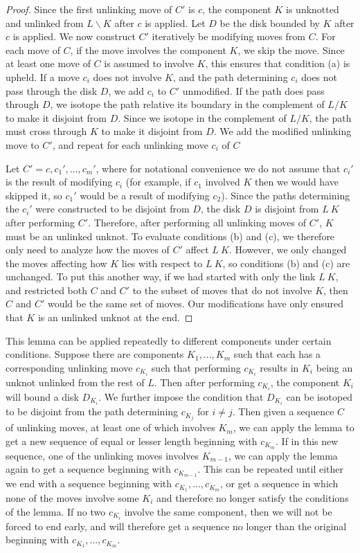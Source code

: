 \documentclass[12pt]{amsart}
\theoremstyle{definition}
\theoremstyle{remark}
\begin{document}
\begin{proof}
Since the first unlinking move of $C'$ is $c$, the component $K$ is unknotted and unlinked from $L\backslash K$ after $c$ is applied.
Let $D$ be the disk bounded by $K$ after $c$ is applied.
We now construct $C'$ iteratively be modifying moves from $C$.
For each move of $C$, if the move involves the component $K$, we skip the move.
Since at least one move of $C$ is assumed to involve $K$, this ensures that condition (a) is upheld.
If a move $c_i$ does not involve $K$, and the path determining $c_i$ does not pass through the disk $D$, we add $c_i$ to $C'$ unmodified.
If the path does pass through $D$, we isotope the path relative its boundary in the complement of $L/K$ to make it disjoint from $D$.
Since we isotope in the complement of $L/K$, the path must cross through $K$ to make it disjoint from $D$.
We add the modified unlinking move to $C'$, and repeat for each unlinking move $c_i$ of $C$

Let $C' = c, c_1', ..., c_m'$, where for notational convenience we do not assume that $c_i'$ is the result of modifying $c_i$ (for example, if $c_1$ involved $K$ then we would have skipped it, so $c_1'$ would be a result of modifying $c_2$).
Since the paths determining the $c_i'$ were constructed to be disjoint from $D$, the disk $D$ is disjoint from $L \ K$ after performing $C'$.
Therefore, after performing all unlinking moves of $C'$, $K$ must be an unlinked unknot.
To evaluate conditions (b) and (c), we therefore only need to analyze how the moves of $C'$ affect $L \ K$.
However, we only changed the moves affecting how $K$ lies with respect to $L \ K$, so conditions (b) and (c) are unchanged.
To put this another way, if we had started with only the link $L \ K$, and restricted both $C$ and $C'$ to the subset of moves that do not involve $K$, then $C$ and $C'$ would be the same set of moves.
Our modifications have only ensured that $K$ is an unlinked unknot at the end.
\end{proof}

This lemma can be applied repeatedly to different components under certain conditions.
Suppose there are components $K_1, ..., K_m$ such that each has a corresponding unlinking move $c_{K_i}$ such that performing $c_{K_i}$ results in $K_i$ being an unknot unlinked from the rest of $L$.
Then after performing $c_{K_i}$, the component $K_i$ will bound a disk $D_{K_i}$.
We further impose the condition that $D_{K_i}$ can be isotoped to be disjoint from the path determining $c_{K_j}$ for $i \not = j$.
Then given a sequence $C$ of unlinking moves, at least one of which involves $K_m$, we can apply the lemma to get a new sequence of equal or lesser length beginning with $c_{K_m}$.
If in this new sequence, one of the unlinking moves involves $K_{m-1}$, we can apply the lemma again to get a sequence beginning with $c_{K_{m-1}}$.
This can be repeated until either we end with a sequence beginning with $c_{K_1}, ..., c_{K_m}$, or get a sequence in which none of the moves involve some $K_i$ and therefore no longer satisfy the conditions of the lemma.
If no two $c_{K_i}$ involve the same component, then we will not be forced to end early, and will therefore get a sequence no longer than the original beginning with $c_{K_1}, ..., c_{K_m}$.
\end{document}

